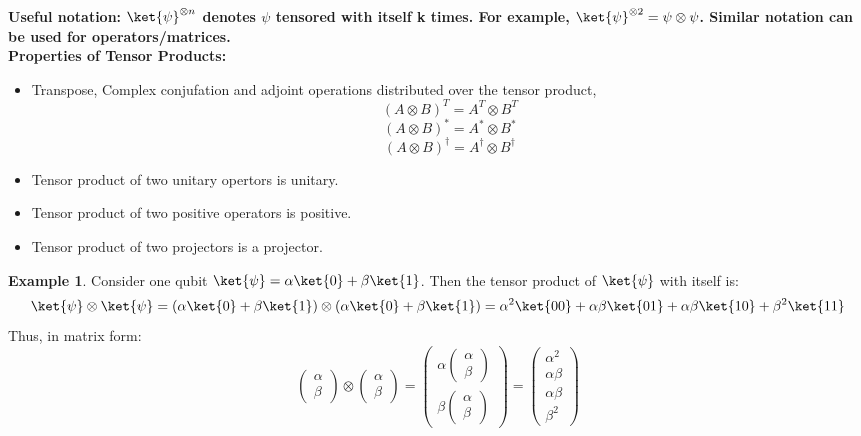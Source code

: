 \documentclass[12pt, oneside]{book}
\theoremstyle{definition}
\theoremstyle{definition}
\newtheorem{example}{Example}[section]
\theoremstyle{remark}
\begin{document}
\textbf{Useful notation: $\ket{\psi}^{\otimes n}$ denotes $\psi$ tensored with itself k times. For example, $\ket{\psi}^{\otimes 2} = \psi \otimes \psi$. Similar notation can be used for operators/matrices.}
\\
\textbf{Properties of Tensor Products: }
\begin{itemize}
    \item Transpose, Complex conjufation and adjoint operations distributed over the tensor product,
    \[ (A \otimes B)^T = A^T \otimes B^T \]
    \[ (A \otimes B)^{*}=A^{*} \otimes B^{*} \]
    \[ (A \otimes B)^{\dagger}=A^{\dagger} \otimes B^{\dagger} \]
    \item Tensor product of two unitary opertors is unitary.
    \item Tensor product of two positive operators is positive.
    \item Tensor product of two projectors is a projector.
\end{itemize}
\begin{example}
    Consider one qubit $\ket{\psi}=\alpha \ket{0} + \beta \ket{1}$. Then the tensor product of $\ket{\psi}$ with itself is:
    \[ \ket{\psi} \otimes \ket{\psi} = (\alpha \ket{0} + \beta \ket{1}) \otimes (\alpha \ket{0} + \beta \ket{1}) = \alpha^2 \ket{00} + \alpha \beta \ket{01} + \alpha \beta \ket{10} + \beta^2 \ket{11} \]
    Thus, in matrix form:
    \[ \begin{pmatrix} \alpha \\ \beta \end{pmatrix} \otimes \begin{pmatrix} \alpha \\ \beta \end{pmatrix} = \begin{pmatrix} \alpha \begin{pmatrix} \alpha \\ \beta \end{pmatrix} \\ \beta \begin{pmatrix} \alpha \\ \beta \end{pmatrix} \end{pmatrix} = \begin{pmatrix} \alpha^2 \\ \alpha \beta \\ \alpha \beta \\ \beta^2 \end{pmatrix} \]
\end{example}
\end{document}
